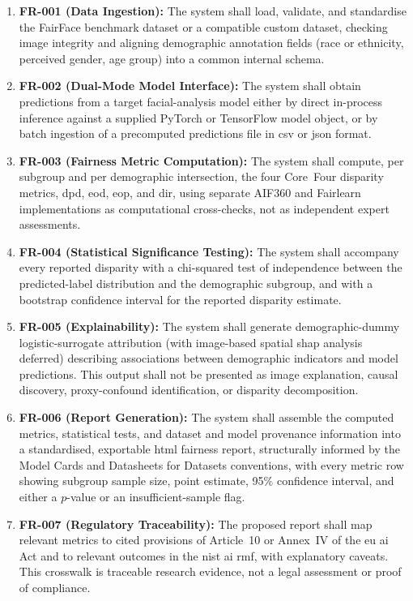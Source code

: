 \begin{enumerate}
    \item \textbf{FR-001 (Data Ingestion):} The system shall load, validate, and standardise the FairFace benchmark dataset or a compatible custom dataset, checking image integrity and aligning demographic annotation fields (race or ethnicity, perceived gender, age group) into a common internal schema.
    \item \textbf{FR-002 (Dual-Mode Model Interface):} The system shall obtain predictions from a target facial-analysis model either by direct in-process inference against a supplied PyTorch or TensorFlow model object, or by batch ingestion of a precomputed predictions file in \gls{csv} or \gls{json} format.
    \item \textbf{FR-003 (Fairness Metric Computation):} The system shall compute, per subgroup and per demographic intersection, the four Core~Four disparity metrics, \gls{dpd}, \gls{eod}, \gls{eop}, and \gls{dir}, using separate AIF360 and Fairlearn implementations as computational cross-checks, not as independent expert assessments.
    \item \textbf{FR-004 (Statistical Significance Testing):} The system shall accompany every reported disparity with a chi-squared test of independence between the predicted-label distribution and the demographic subgroup, and with a bootstrap confidence interval for the reported disparity estimate.
    \item \textbf{FR-005 (Explainability):} The system shall generate demographic-dummy logistic-surrogate attribution (with image-based spatial \gls{shap} analysis deferred) describing associations between demographic indicators and model predictions. This output shall not be presented as image explanation, causal discovery, proxy-confound identification, or disparity decomposition.
    \item \textbf{FR-006 (Report Generation):} The system shall assemble the computed metrics, statistical tests, and dataset and model provenance information into a standardised, exportable \gls{html} fairness report, structurally informed by the Model Cards and Datasheets for Datasets conventions, with every metric row showing subgroup sample size, point estimate, 95\% confidence interval, and either a \(p\)-value or an insufficient-sample flag.
    \item \textbf{FR-007 (Regulatory Traceability):} The proposed report shall map relevant metrics to cited provisions of Article~10 or Annex~IV of the \gls{eu} \gls{ai} Act and to relevant outcomes in the \gls{nist} \gls{ai} \gls{rmf}, with explanatory caveats. This crosswalk is traceable research evidence, not a legal assessment or proof of compliance.

\end{enumerate}
